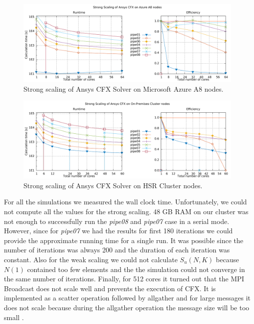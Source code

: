 \documentclass[3p,times]{elsarticle}
\begin{document}
\begin{figure}
\centering
	\centering
	\includegraphics[width=.7\linewidth]{gplt-a8-strong-pipe}	
	\caption{Strong scaling of Ansys CFX Solver on Microsoft Azure A8 nodes. }
	\label{fig:strongA8}
\end{figure}

\begin{figure}
	\centering
	\includegraphics[width=.7\linewidth]{gplt-hsr-strong-pipe}
	\caption{Strong scaling of Ansys CFX Solver on HSR Cluster nodes. }
	\label{fig:strongHSR}
\end{figure}

For all the simulations we measured the wall clock time. Unfortunately, we could not compute all the values for the strong scaling. 48 GB RAM on our cluster was not enough to successfully run the \textit{pipe08} and \textit{pipe07} case in a serial mode. However, since for \textit{pipe07} we had the results for first 180 iterations we could provide the approximate running time for a single run. It was possible since the number of iterations was always 200 and the duration of each iteration was constant. Also for the weak scaling we could not calculate $S_u(N,K)$ because $N(1)$ contained too few elements and the the simulation could not converge in the same number of iterations. Finally, for 512 cores it turned out that the MPI Broadcast does not scale well and prevents the execution of CFX. It is implemented as a scatter operation followed by allgather and for large messages it does not scale because during the allgather operation the message size will be too small \cite{Balaji}.
\end{document}
